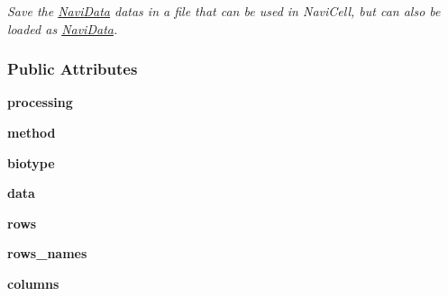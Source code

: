 \begin{DoxyCompactItemize}
\begin{DoxyCompactList}\small\item\em Save the \hyperlink{classnavicom_1_1navidata_1_1NaviData}{NaviData} datas in a file that can be used in NaviCell, but can also be loaded as \hyperlink{classnavicom_1_1navidata_1_1NaviData}{NaviData}. \item\end{DoxyCompactList}\end{DoxyCompactItemize}
\subsubsection*{Public Attributes}
\begin{DoxyCompactItemize}
\item 
\hypertarget{classnavicom_1_1navidata_1_1NaviData_ab3f30d76377459fe539f440df162ea59}{
{\bfseries processing}}
\label{classnavicom_1_1navidata_1_1NaviData_ab3f30d76377459fe539f440df162ea59}

\item 
\hypertarget{classnavicom_1_1navidata_1_1NaviData_ae8f909ed788b49a3c894251957e2f732}{
{\bfseries method}}
\label{classnavicom_1_1navidata_1_1NaviData_ae8f909ed788b49a3c894251957e2f732}

\item 
\hypertarget{classnavicom_1_1navidata_1_1NaviData_a863ac9998d2facd5f86bcea9b6256003}{
{\bfseries biotype}}
\label{classnavicom_1_1navidata_1_1NaviData_a863ac9998d2facd5f86bcea9b6256003}

\item 
\hypertarget{classnavicom_1_1navidata_1_1NaviData_a25ff2e12663e590c22e82bb9a7863987}{
{\bfseries data}}
\label{classnavicom_1_1navidata_1_1NaviData_a25ff2e12663e590c22e82bb9a7863987}

\item 
\hypertarget{classnavicom_1_1navidata_1_1NaviData_a3aabc82d01a697d1c22e82f171438399}{
{\bfseries rows}}
\label{classnavicom_1_1navidata_1_1NaviData_a3aabc82d01a697d1c22e82f171438399}

\item 
\hypertarget{classnavicom_1_1navidata_1_1NaviData_aef041665583f2aa0845418d378ce3a40}{
{\bfseries rows\_\-names}}
\label{classnavicom_1_1navidata_1_1NaviData_aef041665583f2aa0845418d378ce3a40}

\item 
\hypertarget{classnavicom_1_1navidata_1_1NaviData_a16de6799b97fad281e7e4e954b9e4de5}{
{\bfseries columns}}
\label{classnavicom_1_1navidata_1_1NaviData_a16de6799b97fad281e7e4e954b9e4de5}


\end{DoxyCompactItemize}
